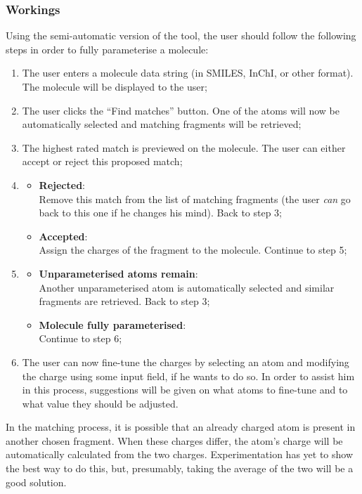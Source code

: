 \subsubsection{Workings}
Using the semi-automatic version of the tool, the user should follow the following steps in order to fully parameterise a molecule:
\begin{enumerate}[itemsep=.1em, parsep=.2em, topsep=0em]
\item The user enters a molecule data string (in SMILES, InChI, or other format). The molecule will be displayed to the user;
\item The user clicks the ``Find matches'' button. One of the atoms will now be automatically selected and matching fragments will be retrieved;
\item The highest rated match is previewed on the molecule. The user can either accept or reject this proposed match;
\item
\begin{itemize}[leftmargin=0cm, itemsep=.1em, parsep=.1em]
\item[]{\bf Rejected}:\\Remove this match from the list of matching fragments (the user \emph{can} go back to this one if he changes his mind). Back to step 3;
\item[] {\bf Accepted}:\\Assign the charges of the fragment to the molecule. Continue to step 5;
\end{itemize}
\item
\begin{itemize}[leftmargin=0cm, itemsep=.1em, parsep=.1em]
\item[]{\bf Unparameterised atoms remain}:\\Another unparameterised atom is automatically selected and similar fragments are retrieved. Back to step 3;
\item[] {\bf Molecule fully parameterised}:\\Continue to step 6;
\end{itemize}
\item The user can now fine-tune the charges by selecting an atom and modifying the charge using some input field, if he wants to do so. In order to assist him in this process, suggestions will be given on what atoms to fine-tune and to what value they should be adjusted.
\end{enumerate}

\noindent
In the matching process, it is possible that an already charged atom is present in another chosen fragment. When these charges differ, the atom's charge will be automatically calculated from the two charges. Experimentation has yet to show the best way to do this, but, presumably, taking the average of the two will be a good solution.

